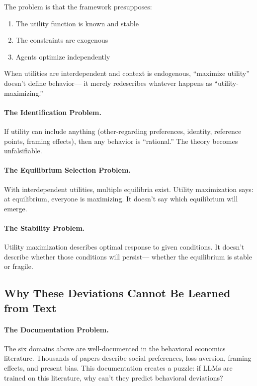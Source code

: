 The problem is that the framework presupposes:
\begin{enumerate}
  \item The utility function is known and stable
  \item The constraints are exogenous
  \item Agents optimize independently
\end{enumerate}

When utilities are interdependent and context is endogenous,
``maximize utility'' doesn't define behavior---
it merely redescribes whatever happens as ``utility-maximizing.''

\paragraph{The Identification Problem.}
If utility can include anything (other-regarding preferences, identity, 
reference points, framing effects), then any behavior is ``rational.''
The theory becomes unfalsifiable.

\paragraph{The Equilibrium Selection Problem.}
With interdependent utilities, multiple equilibria exist.
Utility maximization says: at equilibrium, everyone is maximizing.
It doesn't say which equilibrium will emerge.

\paragraph{The Stability Problem.}
Utility maximization describes optimal response to given conditions.
It doesn't describe whether those conditions will persist---
whether the equilibrium is stable or fragile.

\subsection{Why These Deviations Cannot Be Learned from Text}

\paragraph{The Documentation Problem.}
The six domains above are well-documented in the behavioral economics literature.
Thousands of papers describe social preferences, loss aversion, framing effects,
and present bias. This documentation creates a puzzle: if LLMs are trained on
this literature, why can't they predict behavioral deviations?

